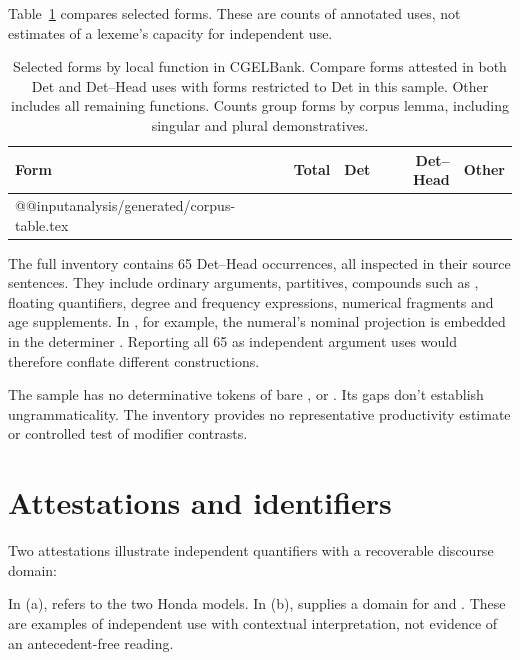 \documentclass[12pt]{article}
\makeatletter
\newcommand{\tablebody}[1]{\csname @@input\endcsname #1 }
\makeatother
\begin{document}
Table~\ref{tab:corpus} compares selected forms. These are counts of annotated uses, not estimates of a lexeme's capacity for independent use.

\begin{table}[H]
\centering\small
\caption{Selected forms by local function in CGELBank. Compare forms attested in both Det and Det--Head uses with forms restricted to Det in this sample. Other includes all remaining functions. Counts group forms by corpus lemma, including singular and plural demonstratives.}\label{tab:corpus}
\begin{tabular}{lrrrr}
\toprule
Form & Total & Det & Det--Head & Other \\
\midrule
\tablebody{analysis/generated/corpus-table.tex}
\bottomrule
\end{tabular}
\end{table}

The full inventory contains 65 Det--Head occurrences, all inspected in their source sentences. They include ordinary arguments, partitives, compounds such as , floating quantifiers, degree and frequency expressions, numerical fragments and age supplements. In , for example, the numeral's nominal projection is embedded in the determiner . Reporting all 65 as independent argument uses would therefore conflate different constructions.

The sample has no determinative tokens of bare ,  or . Its gaps don't establish ungrammaticality. The inventory provides no representative productivity estimate or controlled test of modifier contrasts.

\section{Attestations and identifiers}

Two attestations illustrate independent quantifiers with a recoverable discourse domain:
\ea\label{ex:attested-quantifiers}
\ea {}
\ex {}
\z\z

In (a),  refers to the two Honda models. In (b),  supplies a domain for  and . These are examples of independent use with contextual interpretation, not evidence of an antecedent-free reading.
\end{document}
